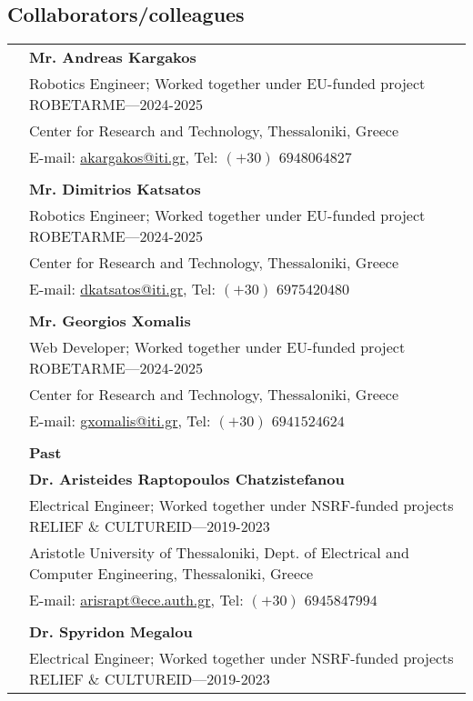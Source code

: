 \documentclass[a4paper,10pt,twoside]{article}
\begin{document}
\subsection*{Collaborators/colleagues}
\vspace{0.5cm}
\begin{tabular}{rp{14cm}}
& \textbf{Mr. Andreas Kargakos} \\
& {Robotics Engineer; Worked together under EU-funded project ROBETARME}---2024-2025\\
& Center for Research and Technology, Thessaloniki, Greece \\
& E-mail: \href{mailto: akargakos@iti.gr}{akargakos@iti.gr}, Tel: $(+30)$ $694 806 4827$  \\
&\\
& \textbf{Mr. Dimitrios Katsatos} \\
& {Robotics Engineer; Worked together under EU-funded project ROBETARME}---2024-2025\\
&Center for Research and Technology, Thessaloniki, Greece \\
& E-mail: \href{mailto: dkatsatos@iti.gr}{dkatsatos@iti.gr}, Tel: $(+30)$ $697 542 0480$ \\
&\\
& \textbf{Mr. Georgios Xomalis} \\
& {Web Developer; Worked together under EU-funded project ROBETARME}---2024-2025\\
&Center for Research and Technology, Thessaloniki, Greece \\
& E-mail: \href{mailto: gxomalis@iti.gr}{gxomalis@iti.gr}, Tel: $(+30)$ $694 152 4624$ \\
&\\
& \textbf{Past}  \vspace{0.15cm} \\
& \textbf{Dr. Aristeides Raptopoulos Chatzistefanou} \\
& {Electrical Engineer; Worked together under NSRF-funded projects RELIEF \& CULTUREID}---2019-2023\\
&Aristotle University of Thessaloniki, Dept. of Electrical and Computer Engineering, Thessaloniki, Greece \\
& E-mail: \href{mailto: arisrapt@ece.auth.gr}{arisrapt@ece.auth.gr}, Tel: $(+30)$ $694 584 7994$ \\
&\\
& \textbf{Dr. Spyridon Megalou} \\
& {Electrical Engineer; Worked together under NSRF-funded projects RELIEF \& CULTUREID}---2019-2023\\

\end{tabular}
\end{document}
